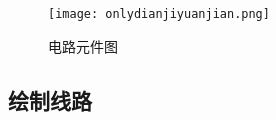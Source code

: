 \noindent
\begin{figure}
\centering
\texttt{[image: onlydianjiyuanjian.png]}
\caption{电路元件图}\label{fig:onlydianziyujian}
\end{figure}
\subsection{绘制线路}

\endinput